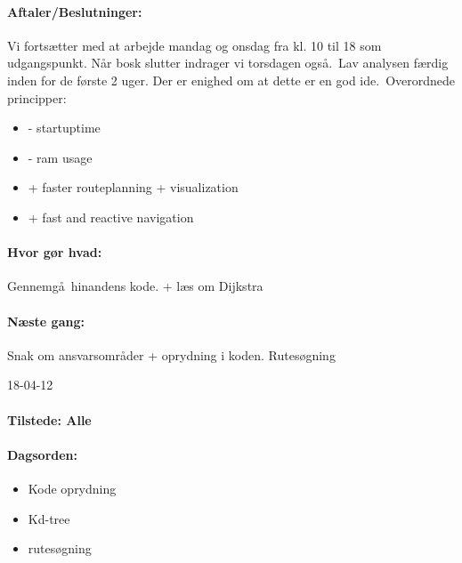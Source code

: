 \documentclass[a4paper,10pt,titlepage]{article}
\begin{document}
		\paragraph{Aftaler/Beslutninger:}
		Vi forts\ae tter med at arbejde mandag og onsdag fra kl. 10 til 18 som udgangspunkt. N\aa r bosk slutter indrager vi torsdagen ogs\aa .\
		Lav analysen f\ae rdig inden for de f\o rste 2 uger. Der er enighed om at dette er en god ide.\
		Overordnede principper:
		\begin{itemize}
		\item - startuptime
		\item - ram usage
		\item + faster routeplanning + visualization
		\item + fast and reactive navigation
		\end{itemize}
			
		\paragraph{Hvor g\o r hvad:}
		Gennemg\aa \ hinandens kode. + l\ae s om Dijkstra 
		
		\paragraph{N\ae ste gang:}
		Snak om ansvarsomr\aa der + oprydning i koden.
		Rutes\o gning\mbox{}\\
		
		\begin{center}
		18-04-12
		\end{center}
		
		\paragraph{Tilstede: Alle}
		\paragraph{Dagsorden:}
		\begin{itemize}
					\item Kode oprydning
					\item Kd-tree
					\item rutes\o gning
		\end{itemize}
		
\end{document}
